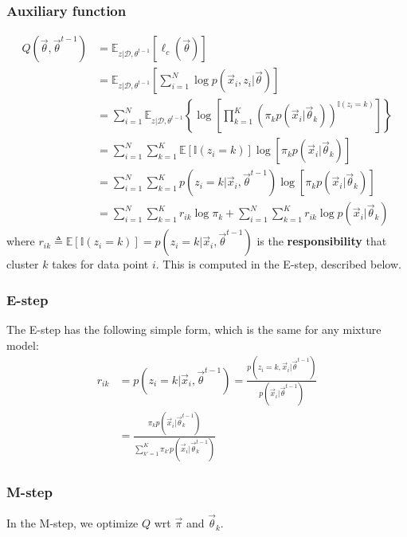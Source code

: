 \subsubsection{Auxiliary function}
\begin{align}
Q(\vec{\theta}, \vec{\theta}^{t-1}) & =\mathbb{E}_{z|\mathcal{D},\theta^{t-1}}\left[\ell_c(\vec{\theta})\right] \nonumber \\
    & = \mathbb{E}_{z|\mathcal{D},\theta^{t-1}}\left[\sum\limits_{i=1}^N \log p(\vec{x}_i,z_i|\vec{\theta})\right] \nonumber \\
	& = \sum\limits_{i=1}^N \mathbb{E}_{z|\mathcal{D},\theta^{t-1}}\left\{\log\left[\prod\limits_{k=1}^K \left(\pi_kp(\vec{x}_i|\vec{\theta}_k)\right)^{\mathbb{I}(z_i=k)}\right]\right\} \nonumber \\
	& = \sum\limits_{i=1}^N{\sum\limits_{k=1}^K{\mathbb{E}[\mathbb{I}(z_i=k)]\log\left[\pi_kp(\vec{x}_i|\vec{\theta}_k)\right]}} \nonumber \\
	& = \sum\limits_{i=1}^N{\sum\limits_{k=1}^K{p(z_i=k|\vec{x}_i,\vec{\theta}^{t-1})\log\left[\pi_kp(\vec{x}_i|\vec{\theta}_k)\right]}} \nonumber \\
	& = \sum\limits_{i=1}^N{\sum\limits_{k=1}^K{r_{ik}\log \pi_k}}+\sum\limits_{i=1}^N{\sum\limits_{k=1}^K{r_{ik}\log p(\vec{x}_i|\vec{\theta}_k)}} \label{eqn:Q-miture-model}
\end{align}
where $r_{ik} \triangleq \mathbb{E}[\mathbb{I}(z_i=k)]=p(z_i=k|\vec{x}_i,\vec{\theta}^{t-1})$ is the \textbf{responsibility} that cluster $k$ takes for data point $i$. This is computed in the E-step, described below.


\subsubsection{E-step}
The E-step has the following simple form, which is the same for any mixture model:
\begin{equation}\begin{split}
r_{ik} & =p(z_i=k|\vec{x}_i,\vec{\theta}^{t-1})=\frac{p(z_i=k,\vec{x}_i|\vec{\theta}^{t-1})}{p(\vec{x}_i|\vec{\theta}^{t-1})} \\
  & =\frac{\pi_kp(\vec{x}_i|\vec{\theta}_k^{t-1})}{\sum_{k'=1}^K \pi_{k'}p(\vec{x}_i|\vec{\theta}_k^{t-1})}
\end{split}\end{equation}

\subsubsection{M-step}
In the M-step, we optimize $Q$ wrt $\vec{\pi}$ and $\vec{\theta}_k$.

